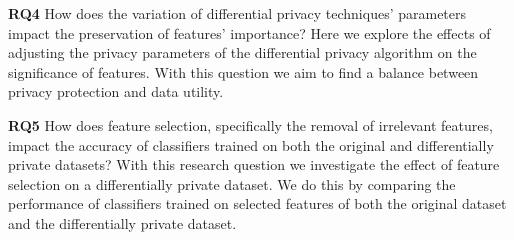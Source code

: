 \textbf{RQ4} How does the variation of differential privacy techniques’ parameters impact the preservation of features’ importance?
Here we explore the effects of adjusting the privacy parameters of the differential privacy algorithm on the significance of features. With this question we aim to find a balance between privacy protection and data utility.

\textbf{RQ5} How does feature selection, specifically the removal of irrelevant features, impact the accuracy of classifiers trained on both the original and differentially private datasets?
With this research question we investigate the effect of feature selection on a differentially private dataset. We do this by comparing the performance of classifiers trained on selected features of both the original dataset and the differentially private dataset.






